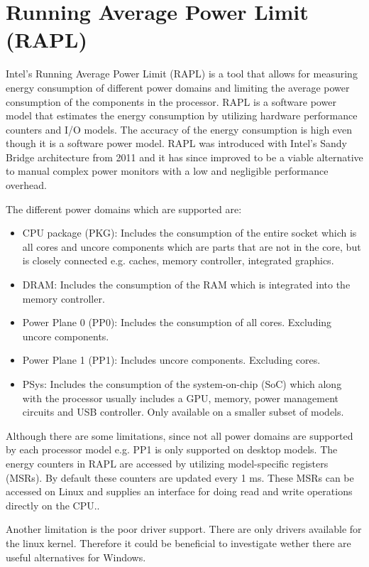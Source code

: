 \section{Running Average Power Limit (RAPL)}
Intel's Running Average Power Limit (RAPL) is a tool that allows for measuring energy consumption of different power domains and limiting the average power consumption of the components in the processor. RAPL is a software power model that estimates the energy consumption by utilizing hardware performance counters and I/O models.\cite{Power-Management_Sandy_Bridge} The accuracy of the energy consumption is high even though it is a software power model\cite{RAPL_ACU1,RAPL_ACU2}. RAPL was introduced with Intel’s Sandy Bridge architecture from 2011 and it has since improved to be a viable alternative to manual complex power monitors with a low and negligible performance overhead. \cite{RAPL_in_action}

The different power domains which are supported are:
\begin{itemize}
    \item CPU package (PKG): Includes the consumption of the entire socket which is all cores and uncore components which are parts that are not in the core, but is closely connected e.g. caches, memory controller, integrated graphics.
    \item DRAM: Includes the consumption of the RAM which is integrated into the memory controller.  
    \item Power Plane 0 (PP0): Includes the consumption of all cores. Excluding uncore components.
    \item Power Plane 1 (PP1): Includes uncore components. Excluding cores.
    \item PSys: Includes the consumption of the system-on-chip (SoC) which along with the processor usually includes a GPU, memory, power management circuits and USB controller. Only available on a smaller subset of models.
\end{itemize}
Although there are some limitations, since not all power domains are supported by each processor model e.g. PP1 is only supported on desktop models. The energy counters in RAPL are accessed by utilizing model-specific registers (MSRs). By default these counters are updated every 1 ms. These MSRs can be accessed on Linux and supplies an interface for doing read and write operations directly on the CPU.\cite{linux_manual_msr}.\nytafsnit

Another limitation is the poor driver support. There are only drivers available for the linux kernel. Therefore it could be beneficial to investigate wether there are useful alternatives for Windows.\cite{RAPL_in_action}  

